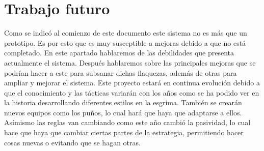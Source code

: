 \section{Trabajo futuro}

Como se indicó al comienzo de este documento este sistema no es más
que un prototipo. Es por esto que es muy susceptible a mejoras
debido a que no está completado. En este apartado hablaremos de las
debilidades que presenta actualmente el sistema. Después hablaremos
sobre las principales mejoras que se podrían hacer a este para subsanar
dichas flaquezas, además de otras para ampliar y mejorar el sistema.
Este proyecto estará en continua evolución debido a que el conocimiento
y las tácticas variarán con los años como se ha podido ver en la historia
desarrollando diferentes estilos en la esgrima. También se crearán nuevos
equipos como los puños, lo cual hará que haya que adaptarse a ellos. Asímismo
las reglas van cambiando como este año cambió la pasividad, lo cual hace
que haya que cambiar ciertas partes de la estrategia, permitiendo hacer
cosas nuevas o evitando que se hagan otras.

